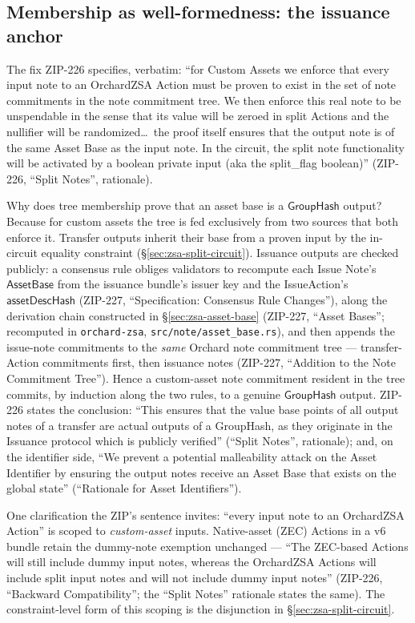 \documentclass[11pt,a4paper]{article}
\theoremstyle{definition}
\newcommand{\GroupHash}{\ensuremath{\mathsf{GroupHash}}}
\begin{document}
\subsection{Membership as well-formedness: the issuance anchor}
\label{sec:zsa-split-membership}

The fix ZIP-226 specifies, verbatim: ``for Custom Assets we enforce that
every input note to an OrchardZSA Action must be proven to exist in the
set of note commitments in the note commitment tree. We then enforce this
real note to be unspendable in the sense that its value will be zeroed in
split Actions and the nullifier will be randomized\dots\ the proof itself
ensures that the output note is of the same Asset Base as the input note.
In the circuit, the split note functionality will be activated by a
boolean private input (aka the split\_flag boolean)'' (ZIP-226, ``Split
Notes'', rationale).

Why does tree membership prove that an asset base is a $\GroupHash$
output? Because for custom assets the tree is fed exclusively from two
sources that both enforce it. Transfer outputs inherit their base from a
proven input by the in-circuit equality constraint
(\S\ref{sec:zsa-split-circuit}). Issuance outputs are checked publicly: a
consensus rule obliges validators to recompute each Issue Note's
$\mathsf{AssetBase}$ from the issuance bundle's issuer key and the
IssueAction's $\mathsf{assetDescHash}$ (ZIP-227, ``Specification:
Consensus Rule Changes''), along the derivation chain constructed in
\S\ref{sec:zsa-asset-base} (ZIP-227, ``Asset Bases''; recomputed in
\texttt{orchard-zsa}, \texttt{src/note/asset\_base.rs}),
and then appends the issue-note commitments to the \emph{same} Orchard
note commitment tree --- transfer-Action commitments first, then issuance
notes (ZIP-227, ``Addition to the Note Commitment Tree''). Hence a
custom-asset note commitment resident in the tree commits, by induction
along the two rules, to a genuine $\GroupHash$ output. ZIP-226 states the
conclusion: ``This ensures that the value base points of all output notes
of a transfer are actual outputs of a GroupHash, as they originate in the
Issuance protocol which is publicly verified'' (``Split Notes'',
rationale); and, on the identifier side, ``We prevent a potential
malleability attack on the Asset Identifier by ensuring the output notes
receive an Asset Base that exists on the global state'' (``Rationale for
Asset Identifiers'').

One clarification the ZIP's sentence invites: ``every input note to an
OrchardZSA Action'' is scoped to \emph{custom-asset} inputs. Native-asset
(ZEC) Actions in a v6 bundle retain the dummy-note exemption unchanged ---
``The ZEC-based Actions will still include dummy input notes, whereas the
OrchardZSA Actions will include split input notes and will not include
dummy input notes'' (ZIP-226, ``Backward Compatibility''; the ``Split
Notes'' rationale states the same). The constraint-level form of this
scoping is the disjunction in \S\ref{sec:zsa-split-circuit}.
\end{document}
